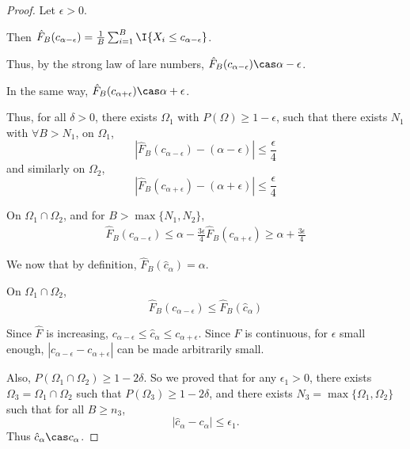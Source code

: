 \begin{proof}
  Let $\epsilon > 0$.

  Then $\hat F_{B}(c_{\alpha - \epsilon}) = \frac{1}{B}
  \sum_{i=1}^{B} \I{X_{i} \leq c_{\alpha - \epsilon}}$.

  Thus, by the strong law of lare numbers, $\hat F_{B}(c_{\alpha -
    \epsilon}) \cas \alpha - \epsilon$.

  In the same way, $\hat F_{B}(c_{\alpha + \epsilon}) \cas \alpha +
  \epsilon$.

  Thus, for all $\delta > 0$, there exists $\Omega_{1}$ with $P(\Omega)
  \geq 1 - \epsilon$, such that there exists $N_{1}$ with $\forall B > N_{1}$,
  on $\Omega_{1}$,
  \begin{equation}
    |\hat F_{B}(c_{\alpha - \epsilon}) - (\alpha - \epsilon)| \leq \frac{\epsilon}{4} 
  \end{equation}
  and similarly on $\Omega_{2}$,
  \begin{equation}
    |\hat F_{B}(c_{\alpha + \epsilon}) - (\alpha + \epsilon)| \leq \frac{\epsilon}{4} 
  \end{equation}

  On $\Omega_{1} \cap \Omega_{2}$, and for $B > \max \{N_{1}, N_{2}
  \}$,
  \begin{align}
    \label{eq:71}
    \hat F_{B}(c_{\alpha - \epsilon}) \leq \alpha -
    \frac{3\epsilon}{4}
    \hat F_{B}(c_{\alpha + \epsilon}) \geq \alpha + \frac{3\epsilon}{4}
  \end{align}

  We now that by definition, $\hat F_{B}(\hat c_{\alpha}) = \alpha$.

  On $\Omega_{1} \cap \Omega_{2}$,
  \begin{equation}
    \label{eq:71}
    \hat F_{B}(c_{\alpha - \epsilon}) \leq \hat F_{B}(\hat c_{\alpha})
  \end{equation}

  Since $\hat F$ is increasing, $c_{\alpha - \epsilon} \leq \hat
  c_{\alpha} \leq c_{\alpha + \epsilon}$.  Since $F$ is continuous,
  for $\epsilon$ small enough, $|c_{\alpha - \epsilon} - c_{\alpha +
    \epsilon}|$ can be made arbitrarily small.

  Also, $P(\Omega_{1} \cap \Omega_{2}) \geq 1 - 2 \delta$.  So we
  proved that for any $\epsilon_{1} > 0$, there exists $\Omega_{3} =
  \Omega_{1} \cap \Omega_{2}$ such that $P(\Omega_{3}) \geq 1 - 2
  \delta$, and there exists $N_{3} = \max \{ \Omega_{1}, \Omega_{2}
  \}$ such that for all $B \geq n_{3}$,
  \begin{equation}
    \label{eq:71}
    |\hat c_{\alpha} - c_{\alpha}| \leq \epsilon_{1}.
  \end{equation}
  Thus $\hat c_{\alpha} \cas c_{\alpha}$.
\end{proof}

